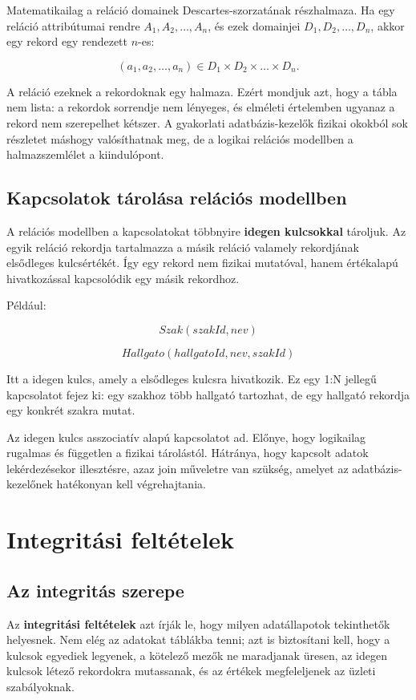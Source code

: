 Matematikailag a reláció domainek Descartes-szorzatának részhalmaza. Ha egy reláció attribútumai rendre \(A_1, A_2, \ldots, A_n\), és ezek domainjei \(D_1, D_2, \ldots, D_n\), akkor egy rekord egy rendezett \(n\)-es:

\[
  (a_1, a_2, \ldots, a_n) \in D_1 \times D_2 \times \ldots \times D_n.
\]

A reláció ezeknek a rekordoknak egy halmaza. Ezért mondjuk azt, hogy a tábla nem lista: a rekordok sorrendje nem lényeges, és elméleti értelemben ugyanaz a rekord nem szerepelhet kétszer. A gyakorlati adatbázis-kezelők fizikai okokból sok részletet máshogy valósíthatnak meg, de a logikai relációs modellben a halmazszemlélet a kiindulópont.

\subsection{Kapcsolatok tárolása relációs modellben}

A relációs modellben a kapcsolatokat többnyire \textbf{idegen kulcsokkal} tároljuk. Az egyik reláció rekordja tartalmazza a másik reláció valamely rekordjának elsődleges kulcsértékét. Így egy rekord nem fizikai mutatóval, hanem értékalapú hivatkozással kapcsolódik egy másik rekordhoz.

Például:

\[
  Szak(szakId, nev)
\]

\[
  Hallgato(hallgatoId, nev, szakId)
\]

Itt a  idegen kulcs, amely a  elsődleges kulcsra hivatkozik. Ez egy 1:N jellegű kapcsolatot fejez ki: egy szakhoz több hallgató tartozhat, de egy hallgató rekordja egy konkrét szakra mutat.

Az idegen kulcs asszociatív alapú kapcsolatot ad. Előnye, hogy logikailag rugalmas és független a fizikai tárolástól. Hátránya, hogy kapcsolt adatok lekérdezésekor illesztésre, azaz join műveletre van szükség, amelyet az adatbázis-kezelőnek hatékonyan kell végrehajtania.

\section{Integritási feltételek}

\subsection{Az integritás szerepe}

Az \textbf{integritási feltételek} azt írják le, hogy milyen adatállapotok tekinthetők helyesnek. Nem elég az adatokat táblákba tenni; azt is biztosítani kell, hogy a kulcsok egyediek legyenek, a kötelező mezők ne maradjanak üresen, az idegen kulcsok létező rekordokra mutassanak, és az értékek megfeleljenek az üzleti szabályoknak.

